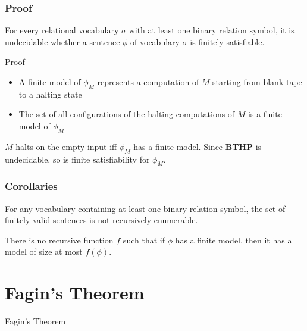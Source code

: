 \documentclass[handout]{beamer}
\begin{document}
\begin{frame}
  \frametitle{Proof}

  \begin{theorem}[Trakhtenbrot]
    For every relational vocabulary $\sigma$ with at least one binary relation
    symbol, it is undecidable whether a sentence $\phi$ of vocabulary
    $\sigma$ is finitely satisfiable.
  \end{theorem}
  
  \begin{alertblock}{Proof}

  \begin{itemize}
    \item A finite model of $\phi_M$ represents a computation of $M$ starting
    from blank tape to a halting state
    \item The set of all configurations of the halting computations of $M$ is a
    finite model of $\phi_M$
  \end{itemize}

  $M$ halts on the empty input iff $\phi_M$ has a finite model. Since
  \textbf{BTHP} is undecidable, so is finite satisfiability for $\phi_M$.
  \end{alertblock}
  
\end{frame}

\begin{frame}
  \frametitle{Corollaries}

  \begin{corollary}
    For any vocabulary containing at least one binary relation symbol, the set
    of finitely valid sentences is not recursively enumerable.
  \end{corollary}

  \begin{corollary}
    There is no recursive function $f$ such that if $\phi$ has a finite model,
    then it has a model of size at most $f(\phi)$.
  \end{corollary}
  
\end{frame}

\section{Fagin's Theorem}

\begin{frame}

\huge
\centering Fagin's Theorem
  
\end{frame}
\end{document}
